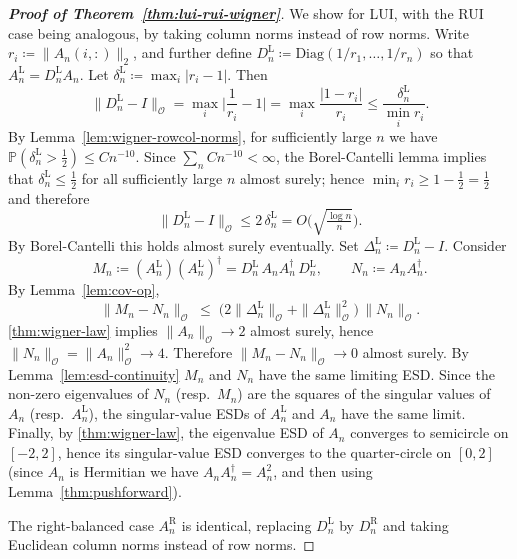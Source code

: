 \documentclass[11pt,a4paper]{article}
\newcommand{\be}{\begin{equation}}
\newcommand{\ee}{\end{equation}}
\newcommand{\op}{\mathcal{O}}
\newcommand{\Prob}{\mathbb{P}}
\begin{document}
\begin{proof}[\textbf{Proof of Theorem~\ref{thm:lui-rui-wigner}}]\label{proof-of-lem1}
We show for LUI, with the RUI case being analogous, by taking column norms instead of row norms. Write $r_i\coloneq \|A_n(i,:)\|_2$, and further define $D_n^{\mathrm L}\coloneq \mathrm{Diag}(1/r_1,\dots,1/r_n)$ so that $A_n^{\mathrm L}=D_n^{\mathrm L}A_n$. Let $\delta_n^{\mathrm L}\coloneq \max_i|r_i-1|$. Then
\be
\|D_n^{\mathrm L}-I\|_{\op} = \max_i \bigg| \frac{1}{r_i} - 1 \bigg| = \max_i\frac{|1-r_i|}{r_i}
\le \frac{\delta_n^{\mathrm L}}{\min_i r_i}.
\ee
By Lemma~\ref{lem:wigner-rowcol-norms}, for sufficiently large $n$ we have $\Prob(\delta_n^{\mathrm L}>\tfrac12)\le Cn^{-10}$. Since $\sum_n Cn^{-10}<\infty$, the Borel-Cantelli lemma implies that $\delta_n^{\mathrm L}\le \tfrac12$ for all sufficiently large $n$ almost surely; hence
$\min_i r_i\ge 1-\tfrac12=\tfrac12$ and therefore
\be
\|D_n^{\mathrm L}-I\|_{\op}\le 2\,\delta_n^{\mathrm L}
=O\!\Big(\sqrt{\tfrac{\log n}{n}}\Big).
\ee
By Borel-Cantelli this holds almost surely eventually. Set $\Delta_n^{\mathrm L}\coloneq D_n^{\mathrm L}-I$. Consider 
\begin{equation}
M_n\coloneq (A_n^{\mathrm L})(A_n^{\mathrm L})^\dagger
=D_n^{\mathrm L}\,A_nA_n^\dagger\,D_n^{\mathrm L},\qquad
N_n\coloneq A_nA_n^\dagger.
\end{equation}
By Lemma~\ref{lem:cov-op},
\begin{equation}
\|M_n-N_n\|_{\op}\;\le\;\bigl(2\|\Delta_n^{\mathrm L}\|_{\op}+\|\Delta_n^{\mathrm L}\|_{\op}^2\bigr)\,\|N_n\|_{\op}.
\end{equation}
\cref{thm:wigner-law} implies $\|A_n\|_{\op}\to 2$ almost surely, hence $\|N_n\|_{\op}=\|A_n\|_{\op}^2\to 4$.
Therefore $\|M_n-N_n\|_{\op}\to 0$ almost surely. By Lemma~\ref{lem:esd-continuity} $M_n$ and $N_n$ have the same limiting ESD. Since the non-zero eigenvalues of $N_n$ (resp.\ $M_n$) are the squares of the singular values of $A_n$ (resp.\ $A_n^{\mathrm L}$), the singular-value ESDs of $A_n^{\mathrm L}$ and $A_n$ have the same limit. Finally, by \cref{thm:wigner-law}, the eigenvalue ESD of $A_n$ converges to semicircle on $[-2,2]$, hence its singular-value ESD converges to the quarter-circle on $[0,2]$ (since $A_n$ is Hermitian we have $A_nA_n^\dagger=A_n^2$, and then using Lemma~\ref{thm:pushforward}). 

The right-balanced case $A_n^{\mathrm R}$ is identical, replacing $D_n^{\mathrm L}$ by $D_n^{\mathrm R}$ and taking Euclidean column norms instead of row norms.
\end{proof}
\end{document}
